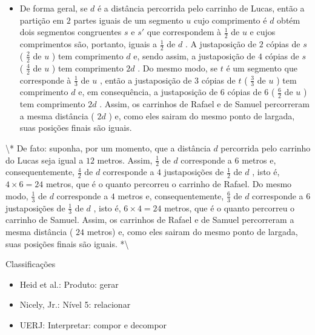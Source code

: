 \documentclass[oneside]{book}
\begin{document}
\begin{multicols}{2}
\begin{itemize}
    \item       De forma geral, se       $d$       é a distância percorrida pelo carrinho de Lucas, então a partição em       $2$       partes iguais de um segmento       $u$       cujo comprimento é       $d$       obtém dois segmentos congruentes       $s$       e       $s'$       que correspondem à       $\frac{1}{2}$       de       $u$       e cujos comprimentos são, portanto, iguais a       $\frac{1}{2}$       de       $d$      . A justaposição de       $2$       cópias de       $s$       (      $\frac{2}{2}$       de       $u$      ) tem comprimento       $d$       e, sendo assim, a justaposição de       $4$       cópias de       $s$       (      $\frac{4}{2}$       de       $u$      ) tem comprimento       $2d$      . Do mesmo modo, se       $t$       é um segmento que corresponde à       $\frac{1}{3}$       de       $u$      , então a justaposição de       $3$       cópias de       $t$       (      $\frac{3}{3}$       de       $u$      ) tem comprimento       $d$       e, em consequência, a justaposição de       $6$       cópias de       $6$       (      $\frac{6}{2}$       de       $u$      ) tem comprimento       $2d$      . Assim, os carrinhos de Rafael e de Samuel percorreram a mesma distância (      $2d$      ) e, como eles sairam do mesmo ponto de largada, suas posições finais são iguais.
\end{itemize} %


  \textbackslash{}*
  De fato: suponha, por um momento, que a distância   $d$   percorrida pelo carrinho do Lucas seja igual a   $12$   metros. Assim,   $\frac{1}{2}$   de   $d$   corresponde a   $6$   metros e, consequentemente,   $\frac{4}{2}$   de   $d$   corresponde a   $4$   justaposições de   $\frac{1}{2}$   de   $d$  , isto é,   $4 \times 6 = 24$   metros, que é o quanto percorreu o carrinho de Rafael. Do mesmo modo,   $\frac{1}{3}$   de   $d$   corresponde a   $4$   metros e, consequentemente,   $\frac{6}{3}$   de   $d$   corresponde a   $6$   justaposições de   $\frac{1}{3}$   de   $d$  , isto é,   $6 \times 4 = 24$   metros, que é o quanto percorreu o carrinho de Samuel. Assim, os carrinhos de Rafael e de Samuel percorreram a mesma distância (  $24$   metros) e, como eles sairam do mesmo ponto de largada, suas posições finais são iguais.
  *\textbackslash{}

  Classificações
\begin{itemize} %
    \item       Heid et al.: Produto: gerar
    \item       Nicely, Jr.: Nível 5: relacionar
    \item       UERJ: Interpretar: compor e decompor
\end{itemize} %



\end{multicols}
\end{document}

